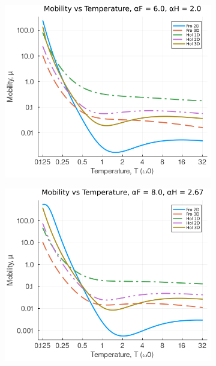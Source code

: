 \begin{figure}[!tbp]
\begin{subfigure}[b]{0.49\textwidth}
  \end{subfigure}
  \begin{subfigure}[b]{0.49\textwidth}
    \includegraphics[width=\textwidth]{figures/mobility_temp_6_2.png}
  \end{subfigure}
  \hfill
  \begin{subfigure}[b]{0.49\textwidth}
    \includegraphics[width=\textwidth]{figures/mobility_temp_8_267.png}
  \end{subfigure}
  \begin{subfigure}[b]{0.49\textwidth}

\end{subfigure}
\end{figure}
